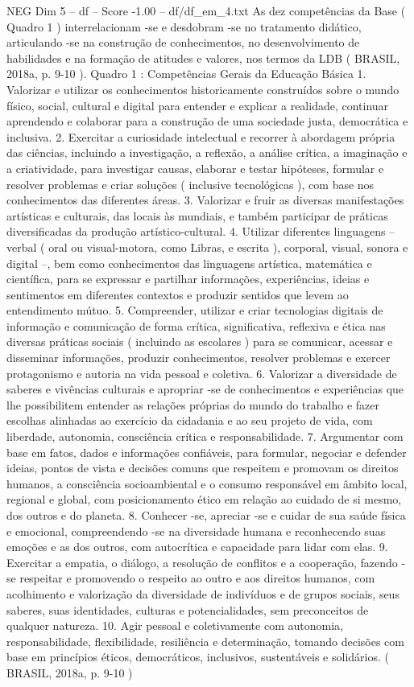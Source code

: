 \begin{textsample}{NEG Dim 5 – df – Score -1.00 – df/df\_em\_4.txt}
As dez competências da Base ( Quadro 1 ) interrelacionam -se e desdobram -se no tratamento didático, articulando -se na construção de conhecimentos, no desenvolvimento de habilidades e na formação de atitudes e valores, nos termos da LDB ( BRASIL, 2018a, p. 9-10 ).
Quadro 1 : Competências Gerais da Educação Básica 1.
Valorizar e utilizar os conhecimentos historicamente construídos sobre o mundo físico, social, cultural e digital para entender e explicar a realidade, continuar aprendendo e colaborar para a construção de uma sociedade justa, democrática e inclusiva. 2.
Exercitar a curiosidade intelectual e recorrer à abordagem própria das ciências, incluindo a investigação, a reflexão, a análise crítica, a imaginação e a criatividade, para investigar causas, elaborar e testar hipóteses, formular e resolver problemas e criar soluções ( inclusive tecnológicas ), com base nos conhecimentos das diferentes áreas. 3.
Valorizar e fruir as diversas manifestações artísticas e culturais, das locais às mundiais, e também participar de práticas diversificadas da produção artístico-cultural. 4.
Utilizar diferentes linguagens – verbal ( oral ou visual-motora, como Libras, e escrita ), corporal, visual, sonora e digital –, bem como conhecimentos das linguagens artística, matemática e científica, para se expressar e partilhar informações, experiências, ideias e sentimentos em diferentes contextos e produzir sentidos que levem ao entendimento mútuo. 5.
Compreender, utilizar e criar tecnologias digitais de informação e comunicação de forma crítica, significativa, reflexiva e ética nas diversas práticas sociais ( incluindo as escolares ) para se comunicar, acessar e disseminar informações, produzir conhecimentos, resolver problemas e exercer protagonismo e autoria na vida pessoal e coletiva. 6.
Valorizar a diversidade de saberes e vivências culturais e apropriar -se de conhecimentos e experiências que lhe possibilitem entender as relações próprias do mundo do trabalho e fazer escolhas alinhadas ao exercício da cidadania e ao seu projeto de vida, com liberdade, autonomia, consciência crítica e responsabilidade. 7.
Argumentar com base em fatos, dados e informações confiáveis, para formular, negociar e defender ideias, pontos de vista e decisões comuns que respeitem e promovam os direitos humanos, a consciência socioambiental e o consumo responsável em âmbito local, regional e global, com posicionamento ético em relação ao cuidado de si mesmo, dos outros e do planeta. 8.
Conhecer -se, apreciar -se e cuidar de sua saúde física e emocional, compreendendo -se na diversidade humana e reconhecendo suas emoções e as dos outros, com autocrítica e capacidade para lidar com elas. 9.
Exercitar a empatia, o diálogo, a resolução de conflitos e a cooperação, fazendo -se respeitar e promovendo o respeito ao outro e aos direitos humanos, com acolhimento e valorização da diversidade de indivíduos e de grupos sociais, seus saberes, suas identidades, culturas e potencialidades, sem preconceitos de qualquer natureza. 10.
Agir pessoal e coletivamente com autonomia, responsabilidade, flexibilidade, resiliência e determinação, tomando decisões com base em princípios éticos, democráticos, inclusivos, sustentáveis e solidários. ( BRASIL, 2018a, p. 9-10 )

\end{textsample}
